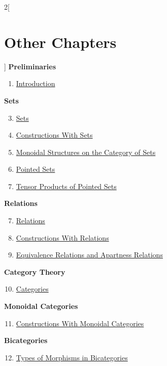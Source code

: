 \begin{multicols}{2}[\section{Other Chapters}]
\noindent
\textbf{Preliminaries}
\begin{enumerate}
\item \hyperref[introduction:section-phantom]{Introduction}
\end{enumerate}
\textbf{Sets}
\begin{enumerate}
\setcounter{enumi}{2}
\item \hyperref[sets:section-phantom]{Sets}
\item \hyperref[constructions-with-sets:section-phantom]{Constructions With Sets}
\item \hyperref[monoidal-structures-on-the-category-of-sets:section-phantom]{Monoidal Structures on the Category of Sets}
\item \hyperref[pointed-sets:section-phantom]{Pointed Sets}
\item \hyperref[tensor-products-of-pointed-sets:section-phantom]{Tensor Products of Pointed Sets}
\end{enumerate}
\textbf{Relations}
\begin{enumerate}
\setcounter{enumi}{6}
\item \hyperref[relations:section-phantom]{Relations}
\item \hyperref[constructions-with-relations:section-phantom]{Constructions With Relations}
\item \hyperref[equivalence-relations-and-apartness-relations:section-phantom]{Equivalence Relations and Apartness Relations}
\end{enumerate}
\textbf{Category Theory}
\begin{enumerate}
\setcounter{enumi}{9}
\item \hyperref[categories:section-phantom]{Categories}
\end{enumerate}
\textbf{Monoidal Categories}
\begin{enumerate}
\setcounter{enumi}{10}
\item \hyperref[constructions-with-monoidal-categories:section-phantom]{Constructions With Monoidal Categories}
\end{enumerate}
\textbf{Bicategories}
\begin{enumerate}
\setcounter{enumi}{11}
\item \hyperref[types-of-morphisms-in-bicategories:section-phantom]{Types of Morphisms in Bicategories}
\end{enumerate}
\end{multicols}
